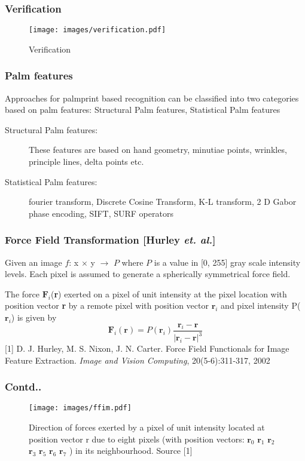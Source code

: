 \documentclass{beamer}
\begin{document}
\begin{frame}
\frametitle{Verification}
\begin{figure}[htp]
\begin{center}
\texttt{[image: images/verification.pdf]}
\caption{Verification\label{verification} }
\end{center}
\end{figure}
\end{frame}

\begin{frame}
\frametitle{Palm features}
Approaches for palmprint based recognition can be classified into two categories based on palm features: Structural Palm features, Statistical Palm features
	\begin{description}
	\item [Structural Palm features: ]These features are based on hand geometry, minutiae points, wrinkles, principle lines,
delta points etc.
  	\item [Statistical Palm features: ] fourier transform, Discrete Cosine Transform, K-L transform, 2 D Gabor phase encoding, SIFT, SURF operators
	\end{description}
\end{frame}

\begin{frame}
\frametitle{Force Field Transformation [Hurley \emph{et. al.}]}
Given an image $f$: x $\times$ y $\rightarrow$ $P$ where $P$ is a value in [0, 255] gray scale intensity levels. Each pixel is assumed to generate a spherically 
symmetrical force field. \cite{forcefield}

The force $\textbf{F}_i$(\textbf{r}) 
exerted on a pixel of unit intensity at the pixel location with position vector \textbf{r} by a remote pixel with position vector $\textbf{r}_i$ and pixel intensity P({$\textbf{r}_i$}) is given by
\begin{equation}
\textbf{F}_i(\textbf{r}) = P(\textbf{r}_i) \frac{\textbf{r}_i - \textbf{r}}{{|\textbf{r}_i - \textbf{r}|}^{3}}
 \end{equation}
[1] D. J. Hurley, M. S. Nixon, J. N. Carter. Force Field Functionals for Image Feature Extraction. \emph{Image and Vision Computing}, 20(5-6):311-317, 2002
\end{frame}

\begin{frame}
  \frametitle{Contd..}
	\begin{figure}
	\begin{center}
	\texttt{[image: images/ffim.pdf]}
	\caption{Direction of forces exerted by a pixel of unit intensity located at position 
vector r due to eight pixels (with position vectors: $\textbf{r}_0$
$\textbf{r}_1$ $\textbf{r}_2$ $\textbf{r}_3$ $\textbf{r}_5$ $\textbf{r}_6$ $\textbf{r}_7$ ) in its
neighbourhood. Source [1]
}
	\label{fig:ffim}
	\end{center}
	\end{figure}
\end{frame}
\end{document}
